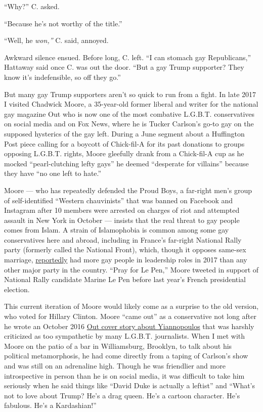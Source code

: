 ``Why?'' C. asked.

``Because he's not worthy of the title.''

``Well, he \emph{won,''} C. said, annoyed.

Awkward silence ensued. Before long, C. left. ``I can stomach gay
Republicans,'' Hattaway said once C. was out the door. ``But a gay Trump
supporter? They know it's indefensible, so off they go.''

But many gay Trump supporters aren't so quick to run from a fight. In
late 2017 I visited Chadwick Moore, a 35-year-old former liberal and
writer for the national gay magazine Out who is now one of the most
combative L.G.B.T. conservatives on social media and on Fox News, where
he is Tucker Carlson's go-to gay on the supposed hysterics of the gay
left. During a June segment about a Huffington Post piece calling for a
boycott of Chick-fil-A for its past donations to groups opposing
L.G.B.T. rights, Moore gleefully drank from a Chick-fil-A cup as he
mocked ``pearl-clutching lefty gays'' he deemed ``desperate for
villains'' because they have ``no one left to hate.''

Moore --- who has repeatedly defended the Proud Boys, a far-right men's
group of self-identified ``Western chauvinists'' that was banned on
Facebook and Instagram after 10 members were arrested on charges of riot
and attempted assault in New York in October --- insists that the real
threat to gay people comes from Islam. A strain of Islamophobia is
common among some gay conservatives here and abroad, including in
France's far-right National Rally party (formerly called the National
Front), which, though it opposes same-sex marriage,
\href{https://www.buzzfeednews.com/article/lesterfeder/frances-nationalist-party-is-winning-gay-support}{reportedly}
had more gay people in leadership roles in 2017 than any other major
party in the country. ``Pray for Le Pen,'' Moore tweeted in support of
National Rally candidate Marine Le Pen before last year's French
presidential election.

This current iteration of Moore would likely come as a surprise to the
old version, who voted for Hillary Clinton. Moore ``came out'' as a
conservative not long after he wrote an October 2016
\href{https://www.out.com/out-exclusives/2016/9/21/send-clown-internet-supervillain-milo-doesnt-care-you-hate-him}{Out
cover story about Yiannopoulos} that was harshly criticized as too
sympathetic by many L.G.B.T. journalists. When I met with Moore on the
patio of a bar in Williamsburg, Brooklyn, to talk about his political
metamorphosis, he had come directly from a taping of Carlson's show and
was still on an adrenaline high. Though he was friendlier and more
introspective in person than he is on social media, it was difficult to
take him seriously when he said things like ``David Duke is actually a
leftist'' and ``What's not to love about Trump? He's a drag queen. He's
a cartoon character. He's fabulous. He's a Kardashian!''

